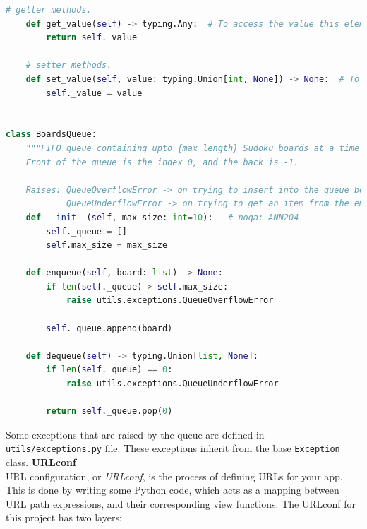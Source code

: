 \documentclass[12pt, a4paper]{report}
\newcommand{\code}[1]{\colorbox{light-gray}{\texttt{#1}}}
\begin{document}
\begin{lstlisting}[language=Python, caption=utils/classes.py]
    # getter methods.
    def get_value(self) -> typing.Any:  # To access the value this element has.
        return self._value

    # setter methods.
    def set_value(self, value: typing.Union[int, None]) -> None:  # To access the value this element will have.
        self._value = value


class BoardsQueue:
    """FIFO queue containing upto {max_length} Sudoku boards at a time.
    Front of the queue is the index 0, and the back is -1.
    
    Raises: QueueOverflowError -> on trying to insert into the queue beyond it's specified max_size
            QueueUnderflowError -> on trying to get an item from the empty queue."""
    def __init__(self, max_size: int=10):   # noqa: ANN204
        self._queue = []
        self.max_size = max_size

    def enqueue(self, board: list) -> None:
        if len(self._queue) > self.max_size:
            raise utils.exceptions.QueueOverflowError
        
        self._queue.append(board)

    def dequeue(self) -> typing.Union[list, None]:
        if len(self._queue) == 0:
            raise utils.exceptions.QueueUnderflowError
        
        return self._queue.pop(0)
    \end{lstlisting}
    Some exceptions that are raised by the queue are defined in \texttt{utils/exceptions.py} file. These exceptions inherit from the base \code{Exception} class.
    \newline
    \textbf{URLconf}\\
    URL configuration, or \textit{URLconf}, is the process of defining URLs for your app. This is done by writing some Python code, which acts as a mapping between URL path expressions, and their corresponding view functions.
    The URLconf for this project has two layers:
\end{document}
